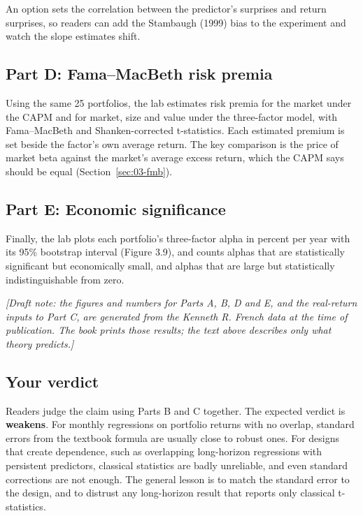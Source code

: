 An option sets the correlation between the predictor's surprises and return surprises, so readers can add the Stambaugh (1999) bias to the experiment and watch the slope estimates shift.

\subsection*{Part D: Fama--MacBeth risk premia}

Using the same 25 portfolios, the lab estimates risk premia for the market under the CAPM and for market, size and value under the three-factor model, with Fama--MacBeth and Shanken-corrected t-statistics. Each estimated premium is set beside the factor's own average return. The key comparison is the price of market beta against the market's average excess return, which the CAPM says should be equal (Section~\ref{sec:03-fmb}).

\subsection*{Part E: Economic significance}

Finally, the lab plots each portfolio's three-factor alpha in percent per year with its 95\% bootstrap interval (Figure 3.9), and counts alphas that are statistically significant but economically small, and alphas that are large but statistically indistinguishable from zero.

\emph{[Draft note: the figures and numbers for Parts A, B, D and E, and the real-return inputs to Part C, are generated from the Kenneth R. French data at the time of publication. The book prints those results; the text above describes only what theory predicts.]}

\subsection*{Your verdict}

Readers judge the claim using Parts B and C together. The expected verdict is \textbf{weakens}. For monthly regressions on portfolio returns with no overlap, standard errors from the textbook formula are usually close to robust ones. For designs that create dependence, such as overlapping long-horizon regressions with persistent predictors, classical statistics are badly unreliable, and even standard corrections are not enough. The general lesson is to match the standard error to the design, and to distrust any long-horizon result that reports only classical t-statistics.

